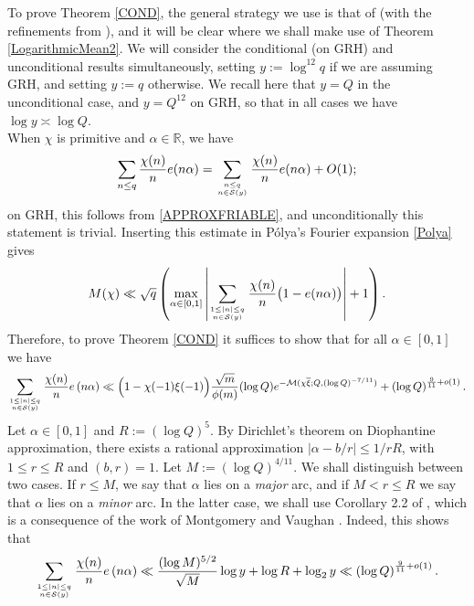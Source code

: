 \documentclass[12pt]{amsart}
\theoremstyle{definition}
\numberwithin{equation}{section}
\newcommand{\mb}{\mathbb}
\newcommand{\mc}{\mathcal}
\renewcommand{\bar}{\overline}
\begin{document}
To prove Theorem \ref{COND}, the general strategy we use is that of \cite{GrSo2} (with the refinements from \cite{GOLD}), and it will be clear where we shall make use of Theorem \ref{LogarithmicMean2}. We will consider the conditional (on GRH) and unconditional results simultaneously, setting $y := \log^{12} q$ if we are assuming GRH, and setting $y := q$ otherwise. We recall here that $y=Q$ in the unconditional case, and $y = Q^{12}$ on GRH, so that in all cases we have $\log y \asymp \log Q$.\\
 When $\chi$ is primitive and $\alpha \in \mb{R}$, we have
\begin{equation*}
\sum_{n \leq q} \frac{\chi(n)}{n}e(n\alpha) = \sum_{n \leq q \atop n \in \mc{S}(y)}\frac{\chi(n)}{n}e(n\alpha) + O(1);
\end{equation*}
on GRH, this follows from \eqref{APPROXFRIABLE}, and unconditionally this statement is trivial.
Inserting this estimate in P\'olya's Fourier expansion \eqref{Polya} gives
\begin{equation*}
M(\chi)\ll \sqrt{q}\left( \max_{\alpha \in [0,1]} \left|\sum_{1\leq |n| \leq q \atop n \in \mc{S}(y)} \frac{\chi(n)}{n}\big(1-e(n\alpha)\big)\right| + 1\right).
\end{equation*}
Therefore, to prove Theorem \ref{COND} it suffices to show that for all $\alpha\in [0, 1]$ we have 
\begin{equation}\label{BoundExponentialSum}
\sum_{1\leq |n| \leq q \atop n \in \mc{S}(y)}\frac{\chi(n)}{n}e\left(n\alpha\right) \ll \Big(1-\chi(-1)\xi(-1)\Big)\frac{\sqrt{m}}{\phi(m)}(\log Q ) e^{-\mc{M}(\chi\bar{\xi};Q, (\log Q)^{-7/11})}+ \left(\log Q\right)^{\frac{9}{11} + o(1)}.
\end{equation}
Let $\alpha\in [0, 1]$ and $R:= (\log Q)^{5}$. By Dirichlet's theorem on Diophantine approximation, there exists a rational approximation $|\alpha - b/r| \leq 1/rR$, with $1\leq r\leq R$ and $(b, r)=1$. 
Let $M := (\log Q)^{4/11}$. We shall distinguish between two cases. If $r\leq M$, we say that $\alpha$ lies on a \emph{major} arc, and if $M<r\leq R$ we say that $\alpha$ lies on a \emph{minor} arc. In the latter case, we shall use Corollary 2.2 of \cite{GOLD}, which is a consequence of the work of Montgomery and Vaughan \cite{MV2}. Indeed, this shows that
\begin{equation*}
\sum_{1\leq |n| \leq q \atop n \in \mc{S}(y)} \frac{\chi(n)}{n}e\left(n\alpha\right) \ll \frac{(\log M)^{5/2}}{\sqrt{M}}\log y +\log R+\log_2 y \ll \left(\log Q\right)^{\frac{9}{11} + o(1)}.
\end{equation*}
\end{document}

